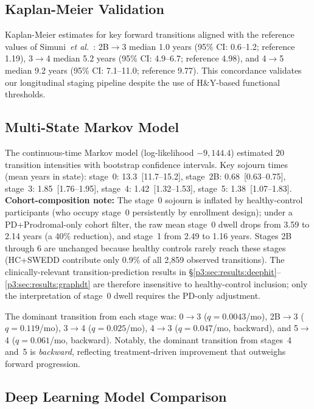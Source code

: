 \subsection{Kaplan-Meier Validation}

Kaplan-Meier estimates for key forward transitions aligned with the reference values of Simuni~\textit{et al.}~\cite{simuni2025}: 2B$\to$3 median 1.0 years (95\% CI: 0.6--1.2; reference 1.19), 3$\to$4 median 5.2 years (95\% CI: 4.9--6.7; reference 4.98), and 4$\to$5 median 9.2 years (95\% CI: 7.1--11.0; reference 9.77). This concordance validates our longitudinal staging pipeline despite the use of H\&Y-based functional thresholds.

\subsection{Multi-State Markov Model}

The continuous-time Markov model (log-likelihood $-9{,}144.4$) estimated 20 transition intensities with bootstrap confidence intervals. Key sojourn times (mean years in state): stage~0: 13.3~[11.7--15.2], stage~2B: 0.68~[0.63--0.75], stage~3: 1.85~[1.76--1.95], stage~4: 1.42~[1.32--1.53], stage~5: 1.38~[1.07--1.83]. \textbf{Cohort-composition note:} The stage~0 sojourn is inflated by healthy-control participants (who occupy stage~0 persistently by enrollment design); under a PD+Prodromal-only cohort filter, the raw mean stage~0 dwell drops from 3.59 to 2.14 years (a 40\% reduction), and stage~1 from 2.49 to 1.16 years. Stages 2B through 6 are unchanged because healthy controls rarely reach these stages (HC+SWEDD contribute only 0.9\% of all 2{,}859 observed transitions). The clinically-relevant transition-prediction results in \S\ref{p3:sec:results:deephit}--\ref{p3:sec:results:graphdt} are therefore insensitive to healthy-control inclusion; only the interpretation of stage~0 dwell requires the PD-only adjustment.

The dominant transition from each stage was: 0$\to$3 ($q{=}0.0043$/mo), 2B$\to$3 ($q{=}0.119$/mo), 3$\to$4 ($q{=}0.025$/mo), 4$\to$3 ($q{=}0.047$/mo, backward), and 5$\to$4 ($q{=}0.061$/mo, backward). Notably, the dominant transition from stages~4 and~5 is \textit{backward}, reflecting treatment-driven improvement that outweighs forward progression.

\subsection{Deep Learning Model Comparison}

